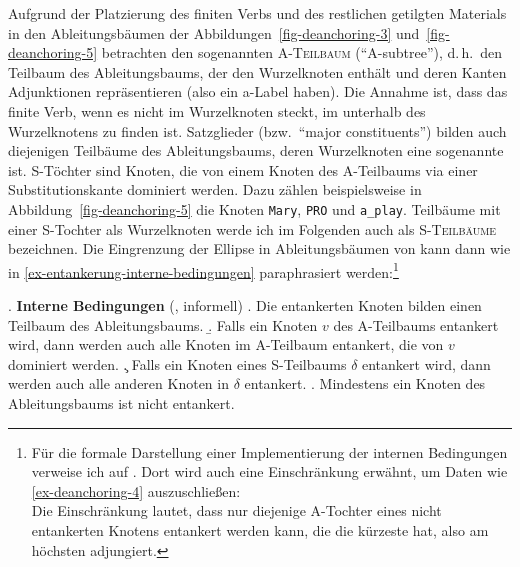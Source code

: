 Aufgrund der Platzierung des finiten Verbs und des restlichen getilgten Materials in den Ableitungsbäumen der Abbildungen~\ref{fig-deanchoring-3} und~\ref{fig-deanchoring-5} betrachten \cite{Lichte:Kallmeyer:10} den sogenannten \textsc{A-Teilbaum} ("`A-subtree"'), d.\,h.\ den Teilbaum des Ableitungsbaums, der den Wurzelknoten enthält und deren Kanten Adjunktionen repräsentieren (also ein {\sc a}-Label haben). Die Annahme ist, dass das finite Verb, wenn es nicht im Wurzelknoten steckt, im  unterhalb des Wurzelknotens zu finden ist. Satzglieder (bzw.\ "`major constituents"') bilden auch diejenigen Teilbäume des Ableitungsbaums, deren Wurzelknoten eine sogenannte  ist. S-Töchter sind Knoten, die von einem Knoten des A-Teilbaums via einer Substitutionskante dominiert werden. Dazu zählen beispielsweise in Abbildung~\ref{fig-deanchoring-5} die Knoten {\tt Mary}, {\tt PRO} und {\tt a\_play}.  Teilbäume mit einer S-Tochter als Wurzelknoten werde ich im Folgenden auch als \textsc{S-Teilbäume} bezeichnen. Die Eingrenzung der Ellipse in Ableitungsbäumen von \cite{Lichte:Kallmeyer:10} kann dann wie in \ref{ex-entankerung-interne-bedingungen} paraphrasiert werden:\footnote{Für die formale Darstellung einer Implementierung der internen Bedingungen verweise ich auf \cite{Lichte:Kallmeyer:10}. Dort wird auch eine Einschränkung erwähnt, um Daten wie \ref{ex-deanchoring-4} auszuschlie\ss en:\\
Die Einschränkung lautet, dass nur diejenige A-Tochter eines nicht entankerten Knotens entankert werden kann, die die kürzeste  hat, also am höchsten adjungiert. 
} 

\ex. {\bf Interne Bedingungen} (\cite{Lichte:Kallmeyer:10}, informell) \label{ex-entankerung-interne-bedingungen}
\a. Die entankerten Knoten bilden einen Teilbaum des Ableitungsbaums.
\b. Falls ein Knoten $v$ des A-Teilbaums entankert wird, dann werden auch alle Knoten im A-Teilbaum entankert, die von $v$ dominiert werden.\label{ex-entankerung-interne-bedingungen-b}
\c. Falls ein Knoten eines S-Teilbaums $\delta$ entankert wird, dann werden auch alle anderen Knoten in $\delta$ entankert.
\e. Mindestens ein Knoten des Ableitungsbaums ist nicht entankert.

